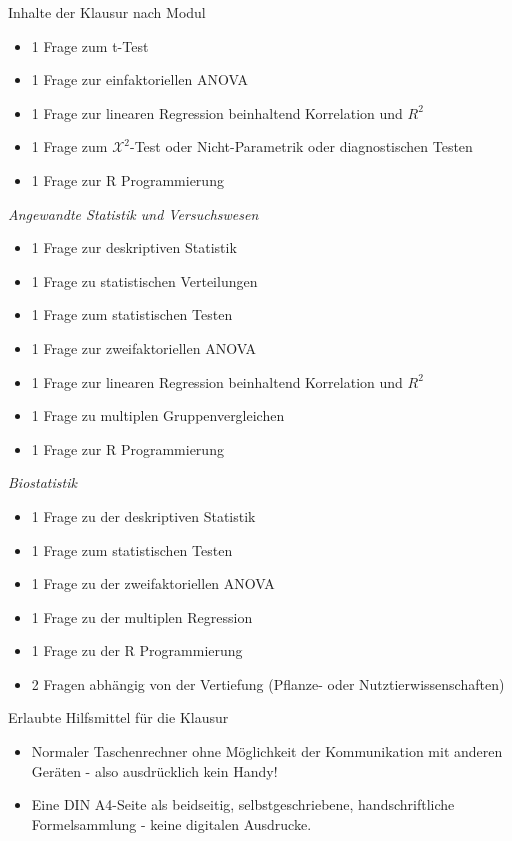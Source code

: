 \documentclass[a4paper, 10pt]{scrartcl}\usepackage[]{graphicx}\usepackage[]{xcolor}
\begin{document}
\begin{graybox}{Inhalte der Klausur nach Modul}
\begin{itemize}
  \item 1 Frage zum t-Test
  \item 1 Frage zur einfaktoriellen ANOVA
  \item 1 Frage zur linearen Regression beinhaltend Korrelation und $R^2$
  \item 1 Frage zum $\mathcal{X}^2$-Test oder Nicht-Parametrik oder diagnostischen Testen
  \item 1 Frage zur R Programmierung
  \end{itemize} 
  \textit{Angewandte Statistik und Versuchswesen} 
  \begin{itemize}
  \item 1 Frage zur deskriptiven Statistik
  \item 1 Frage zu statistischen Verteilungen
  \item 1 Frage zum statistischen Testen
  \item 1 Frage zur zweifaktoriellen ANOVA
  \item 1 Frage zur linearen Regression beinhaltend Korrelation und $R^2$
  \item 1 Frage zu multiplen Gruppenvergleichen
  \item 1 Frage zur R Programmierung
  \end{itemize} 
  \textit{Biostatistik}
  \begin{itemize}
  \item 1 Frage zu der deskriptiven Statistik
  \item 1 Frage zum statistischen Testen
  \item 1 Frage zu der zweifaktoriellen ANOVA
  \item 1 Frage zu der multiplen Regression
  \item 1 Frage zu der R Programmierung
  \item 2 Fragen abhängig von der Vertiefung (Pflanze- oder Nutztierwissenschaften)
  \end{itemize} 
\end{graybox}
  
  
\maketitle
\thispagestyle{empty}
\clearpage

\begin{graybox}{Erlaubte Hilfsmittel für die Klausur}
  \vspace{1Ex}
  \begin{itemize}
  \item Normaler Taschenrechner ohne Möglichkeit der Kommunikation mit anderen
    Geräten - also ausdrücklich kein Handy!
  \item Eine DIN A4-Seite als beidseitig, selbstgeschriebene,
    handschriftliche Formelsammlung - keine digitalen Ausdrucke. 
  \end{itemize}
\end{graybox}
\vfill
\end{document}
